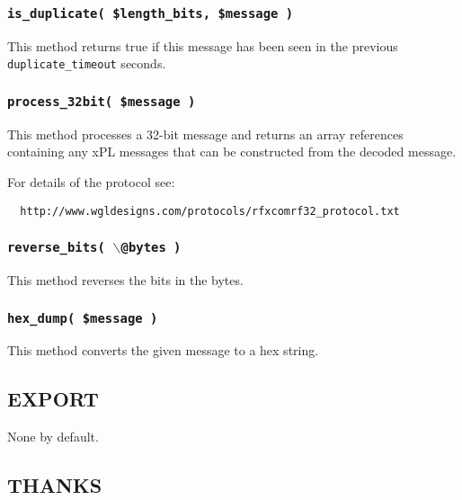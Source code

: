 \documentclass[12pt,a4paper]{article}
\begin{document}
\subsubsection*{\texttt{is\_duplicate( \$length\_bits, \$message )}\label{xPL::RF_is_duplicate_length_bits_message_}}


This method returns true if this message has been seen in the
previous \texttt{duplicate\_timeout} seconds.

\subsubsection*{\texttt{process\_32bit( \$message )}\label{xPL::RF_process_32bit_message_}}


This method processes a 32-bit message and returns an array references
containing any xPL messages that can be constructed from the decoded
message.



For details of the protocol see:

\begin{verbatim}
  http://www.wgldesigns.com/protocols/rfxcomrf32_protocol.txt
\end{verbatim}
\subsubsection*{\texttt{reverse\_bits( $\backslash$@bytes )}\label{xPL::RF_reverse_bits_backslash_bytes_}}


This method reverses the bits in the bytes.

\subsubsection*{\texttt{hex\_dump( \$message )}\label{xPL::RF_hex_dump_message_}}


This method converts the given message to a hex string.

\subsection*{EXPORT\label{xPL::RF_EXPORT}}


None by default.

\subsection*{THANKS\label{xPL::RF_THANKS}}
\end{document}
